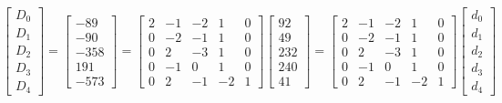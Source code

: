 \documentclass{article}%
\begin{document}
\[%
\left[\begin{matrix}D_{0}\\D_{1}\\D_{2}\\D_{3}\\D_{4}\end{matrix}\right] = \left[\begin{matrix}-89\\-90\\-358\\191\\-573\end{matrix}\right] = \left[\begin{matrix}2 & -1 & -2 & 1 & 0\\0 & -2 & -1 & 1 & 0\\0 & 2 & -3 & 1 & 0\\0 & -1 & 0 & 1 & 0\\0 & 2 & -1 & -2 & 1\end{matrix}\right] \left[\begin{matrix}92\\49\\232\\240\\41\end{matrix}\right] = \left[\begin{matrix}2 & -1 & -2 & 1 & 0\\0 & -2 & -1 & 1 & 0\\0 & 2 & -3 & 1 & 0\\0 & -1 & 0 & 1 & 0\\0 & 2 & -1 & -2 & 1\end{matrix}\right] \left[\begin{matrix}d_{0}\\d_{1}\\d_{2}\\d_{3}\\d_{4}\end{matrix}\right]%
\]%
\end{document}
